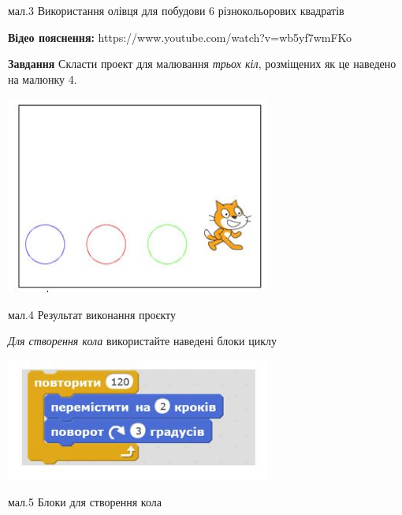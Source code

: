 \documentclass{article}
\begin{document}
мал.3 Використання олівця для побудови 6 різнокольорових квадратів 
\newline

\textbf {Відео пояснення:} https://www.youtube.com/watch?v=wb5yf7wmFKo
\newline

\textbf {Завдання}
Скласти проект для малювання \textit{трьох кіл}, розміщених як це наведено на малюнку 4. 

\includegraphics[width=0.65\textwidth]{4}

мал.4 Результат виконання проєкту
\newline

\textit{Для створення кола} використайте наведені блоки циклу

\includegraphics[width=0.65\textwidth]{5}

мал.5 Блоки для створення кола
\end{document}
